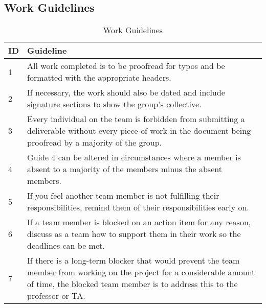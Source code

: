 \documentclass{article}
\begin{document}
\subsection*{Work Guidelines}
\begin{table}[H]
\caption{Work Guidelines}
\centering
\begin{tabular}{|l|p{12cm}|}
\hline
\textbf{ID} & \textbf{Guideline} \\ \hline
1 & All work completed is to be proofread for typos and be formatted with the appropriate headers. \\ \hline
2 & If necessary, the work should also be dated and include signature sections to show the group's collective. \\ \hline
3 & Every individual on the team is forbidden from submitting a deliverable without every piece of work in the document being proofread by a majority of the group. \\ \hline
4 & Guide 4 can be altered in circumstances where a member is absent to a majority of the members minus the absent members. \\ \hline
5 & If you feel another team member is not fulfilling their responsibilities, remind them of their responsibilities early on. \\ \hline
6 & If a team member is blocked on an action item for any reason, discuss as a team how to support them in their work so the deadlines can be met. \\ \hline
7 & If there is a long-term blocker that would prevent the team member from working on the project for a considerable amount of time, the blocked team member is to address this to the professor or TA. \\ \hline
\end{tabular}
\label{tab:work-guidelines}
\end{table}
\end{document}
